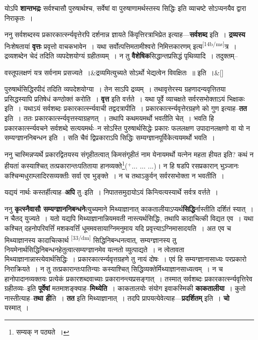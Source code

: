 \documentclass[article,12pt,a4paper]{memoir}
\newcommand{\add}[1]{($^{+}$#1)}
\begin{document}
	  \pstart योऽपि \textbf{शान्तभद्रः} सर्वश्चासौ पुरुषार्थश्च, सर्वेषां वा पुरुषाणामर्थस्तस्य सिद्धिः इति व्याचष्टे सोऽप्यनयैव द्वारा निराकृतः ।
	\pend
      

	  \pstart ननु सर्वशब्दस्य प्रकारकार्त्स्न्यवृत्तेरपि दर्शनान्न ज्ञायते किंवृत्तिरत्राभिप्रेत इत्याह—\textbf{सर्वशब्द} इति । \textbf{द्रव्यस्य} निःशेषतायां \textbf{वृत्तः} प्रवृत्तो वाचकभावेन । यथा सर्वोत्पत्तिमतामीश्वरो निमित्तकारणम् इत्य\leavevmode\textsuperscript{\rmlatinfont\tiny [14b/ms]}त्र । द्रव्यशब्देन चेदं तदिति व्यपदेशयोग्यं ग्रहीतव्यम् । न तु \textbf{वैशेषिक}सिद्धान्तप्रसिद्धं पृथिव्यादि । तदुक्तम्--
	\pend
      
	    
	    \stanza[\smallbreak]
वस्तूपलक्षणं यत्र सर्वनाम प्रसज्यते ।&द्रव्यमित्युच्यते सोऽर्थो भेद्यत्वेन विवक्षितः ॥ इति ।\&[\smallbreak]


	

	  \pstart पुरुषार्थसिद्धिरपीदं तदिति व्यपदेशयोग्या । तेन साऽपि द्रव्यम् । तथावृत्तेरस्य ग्रहणादन्यवृत्तितया प्रसिद्धस्यापि प्रतिषेधं कण्ठोक्तं करोति । \textbf{वृत्त} इति वर्त्तते । यथा पूर्वे व्याचक्षते सर्वरसभोक्ताऽयं भिक्षाकः इति । यथाऽयं सर्वशब्दः प्रकारकार्त्स्न्यवाची तद्वदत्रापीति । प्रकारकार्त्स्न्यवृत्तेरग्रहणे को गुण इत्याह--\textbf{तत} इति । ततः प्रकारकार्त्स्न्यवृत्तस्याग्रहणत् । तथापि कथमयमर्थो भवतीति चेत् । भवति हि प्रकारकार्त्स्न्यवचने सर्वशब्दे सत्ययमर्थः--न सोऽस्ति पुरुषार्थसिद्धेः प्रकारः फललक्षण उपादानलक्षणो वा यो न सम्यग्ज्ञाननिबन्धन इति । सति चैवं द्विप्रकाराऽपि सिद्धिः सम्यग्ज्ञानपूर्विकेत्ययमर्थो भवति ।
	\pend
      

	  \pstart ननु चास्मिन्नप्यर्थे प्रकारद्वितयस्य संगृहीतत्वात् किमसंगृहीतं नाम येनायमर्थो यत्नेन महता हीयत इति? कथं न हीयतां कस्याश्चित् तत्प्रकारान्तःपतिताया हानव्यक्ते\footnote{सम्यक् न पठ्यते ।}\add{... ... ...}। न हि षडपि रसप्रकारान् भुञ्जानः कश्चिन्मधुराम्लादिरसव्यक्तीः सर्वा एव भुङ्क्ते । न च तथाऽकुर्वन् सर्वरसभोक्ता न भवतीति ।
	\pend
      

	  \pstart यद्ययं नार्थः कस्तर्हीत्याह--\textbf{अपि} तु--इति । निपातसमुदायोऽयं किन्त्वित्यस्यार्थे सर्वत्र वर्त्तते ।
	\pend
      

	  \pstart ननु \textbf{कृत्स्नैवासौ सम्यग्ज्ञाननिबन्धने}त्युच्यमाने मिथ्याज्ञानात् काकतालीयाऽप्यर्थ\textbf{सिद्धि}र्नास्तीति दर्शितं स्यात् । न चैतद् युज्यते । यतो यद्यपि मिथ्याज्ञानान्नियमवती नास्त्यर्थसिद्धिः, तथापि कादाचित्की विद्यत एव । यथा कश्चित् दहनोपरिवर्त्तिं मशकवर्त्तिं धूममवसायाग्निमनुमाय यदि प्रवृत्त्याऽग्निमासादयति । अत एव च मिथ्याज्ञानस्य कादाचित्कार्थ \leavevmode\textsuperscript{\rmlatinfont\tiny [33/dm]} सिद्धिनिबन्धनत्वात्, सम्यग्ज्ञानस्य तु नियमेनार्थसिद्धिनिबन्धनहेतुत्वात्सम्यग्ज्ञानमेव यत्नतो व्युत्पाद्यते । न त्वेतावता मिथ्याज्ञानान्नास्त्येवार्थसिद्धिः । प्रकारकार्त्स्न्यवृत्तग्रहणे तु नायं दोषः । एवं हि सम्यग्ज्ञानासाध्यः परप्रकारो निराक्रियते । न तु तत्प्रकारान्तःपातिन्याः कस्याश्चित् सिद्धिव्यक्तेर्मिथ्याज्ञानसाध्यत्वम् । न च हानोपादानव्यक्तयः प्रत्येकं प्रकारशब्दवाच्याः प्रकारानन्त्यप्रसङ्गात् । तस्मात् सर्वशब्दः प्रकारकार्त्स्न्यवृत्तिरेव ग्रहीतव्यः--इति \textbf{पूर्वेषां} मतमाशङ्क्याह--\textbf{मिथ्येति} । काकतालयोः संयोग इवाकस्मिकी \textbf{काकतालीया} । कुतो नास्तीत्याह--\textbf{तथा ही}ति । \textbf{तत} इति मिथ्याज्ञानात् । तदपि प्रापयत्येवेत्याह—\textbf{प्रदर्शितम्} इति । \textbf{चो} यस्मात् ।
	\pend
      
\end{document}
